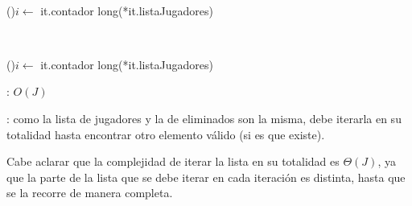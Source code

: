 \begin{Algoritmos}
	~

	\begin{algorithm}[H]
		\NoCaptionOfAlgo
		\caption{}
		\For(){$i \leftarrow$ it.contador \KwTo long(*it.listaJugadores)}{
		}
	\end{algorithm}

	~

	\begin{algorithm}[H]
		\NoCaptionOfAlgo
		\caption{}
		\For(){$i \leftarrow$ it.contador \KwTo long(*it.listaJugadores)}{
		}
	\end{algorithm}

	\complejidad: $O(J)$

	\justifcomp: como la lista de jugadores y la de eliminados son la misma, debe iterarla en su totalidad hasta encontrar otro elemento válido (si es que existe).

	Cabe aclarar que la complejidad de iterar la lista en su totalidad es $\Theta(J)$, ya que la parte de la lista que se debe iterar en cada iteración es distinta, hasta que se la recorre de manera completa.

\end{Algoritmos}
